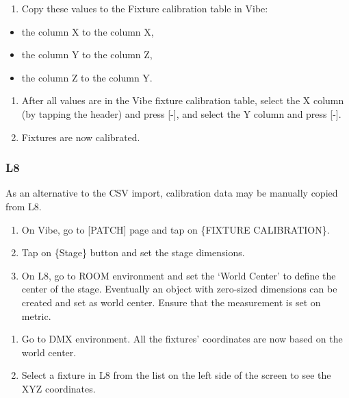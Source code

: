 \documentclass[
]{article}
\providecommand{\tightlist}{%
  \setlength{\itemsep}{0pt}\setlength{\parskip}{0pt}}
\begin{document}
\begin{enumerate}
\def\labelenumi{\arabic{enumi}.}
\setcounter{enumi}{5}
\tightlist
\item
  Copy these values to the Fixture calibration table in Vibe:
\end{enumerate}

\begin{itemize}
\item
  the column X to the column X,
\item
  the column Y to the column Z,
\item
  the column Z to the column Y.
\end{itemize}

\begin{enumerate}
\def\labelenumi{\arabic{enumi}.}
\setcounter{enumi}{6}
\item
  After all values are in the Vibe fixture calibration table, select the X column (by tapping the header) and press {[}-{]}, and select the Y column and press {[}-{]}.
\item
  Fixtures are now calibrated.
\end{enumerate}

\hypertarget{l8}{%
\subsubsection{L8}\label{l8}}

As an alternative to the CSV import, calibration data may be manually copied from L8.

\begin{enumerate}
\def\labelenumi{\arabic{enumi}.}
\item
  On Vibe, go to {[}PATCH{]} page and tap on \{FIXTURE CALIBRATION\}.
\item
  Tap on \{Stage\} button and set the stage dimensions.
\item
  On L8, go to ROOM environment and set the `World Center' to define the center of the stage. Eventually an object with zero-sized dimensions can be created and set as world center. Ensure that the measurement is set on metric.
\end{enumerate}

\begin{enumerate}
\def\labelenumi{\arabic{enumi}.}
\setcounter{enumi}{3}
\item
  Go to DMX environment. All the fixtures' coordinates are now based on the world center.
\item
  Select a fixture in L8 from the list on the left side of the screen to see the XYZ coordinates.
\end{enumerate}
\end{document}
